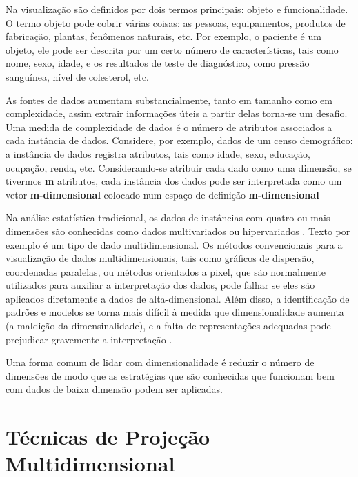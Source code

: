 Na visualização são definidos por dois termos principais: objeto e funcionalidade. O termo objeto pode cobrir várias coisas: as pessoas, equipamentos, produtos de fabricação, plantas, fenômenos naturais, etc. Por exemplo, o paciente é um objeto, ele pode ser descrita por um certo número de características, tais como nome, sexo, idade, e os resultados de teste de diagnóstico, como pressão sanguínea, nível de colesterol, etc. \cite{dzemyda2013multidimensional}
%
%


As fontes de dados aumentam substancialmente, tanto em tamanho como em complexidade, assim extrair informações úteis a partir delas torna-se um desafio. Uma medida de complexidade de dados é o número de atributos associados a cada instância de dados. Considere, por exemplo, dados de um censo demográfico: a instância de dados registra atributos, tais como idade, sexo, educação, ocupação, renda, etc. \cite{paulovich2008least} 
%
%
Considerando-se atribuir cada dado como uma dimensão, se tivermos \textbf{m} atributos, cada instância dos dados pode ser interpretada como um vetor \textbf{m-dimensional} colocado num espaço de definição \textbf{m-dimensional} \cite{paulovich2008least}

Na análise estatística tradicional, os dados de instâncias com quatro ou mais dimensões são conhecidas como dados multivariados ou hipervariados \cite{ware2012information}. Texto por exemplo é um tipo de dado multidimensional. Os métodos convencionais para a visualização de dados multidimensionais, tais como gráficos de dispersão, coordenadas paralelas, ou métodos orientados a pixel, que são normalmente utilizados para auxiliar a interpretação dos dados, pode falhar se eles são aplicados diretamente a dados de alta-dimensional. Além disso, a identificação de padrões e modelos se torna mais difícil à medida que dimensionalidade aumenta (a maldição da dimensinalidade), e a falta de representações adequadas pode prejudicar gravemente a interpretação \cite{paulovich2008least}.

Uma forma comum de lidar com dimensionalidade é reduzir o número de dimensões de modo que as estratégias que são conhecidas que funcionam bem com dados de baixa dimensão podem ser aplicadas.  


\section{Técnicas de Projeção Multidimensional}

